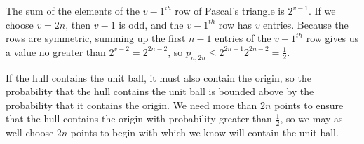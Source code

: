 The sum of the elements of the $v-1^{th}$ row of Pascal's triangle is $2^{v-1}$\cite{mathworld_pascal}. If we choose $v = 2n$, then $v-1$ is odd, and the $v-1^{th}$ row has $v$ entries. Because the rows are symmetric, summing up the first $n-1$ entries of the $v-1^{th}$ row gives us a value no greater than $2^{v-2} = 2^{2n-2}$, so $p_{n, 2n} \leqslant 2^{2n+1} 2^{2n-2} = \frac{1}{2}$.

If the hull contains the unit ball, it must also contain the origin, so the probability that the hull contains the unit ball is bounded above by the probability that it contains the origin. We need more than $2n$ points to ensure that the hull contains the origin with probability greater than $\frac{1}{2}$, so we may as well choose $2n$ points to begin with which we know will contain the unit ball.